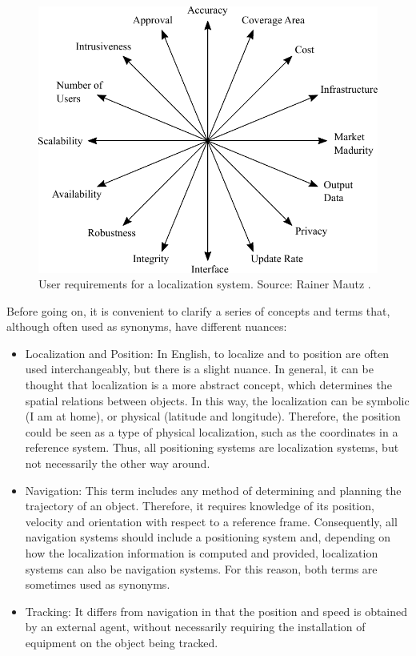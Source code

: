 \begin{figure}[!t]
    \centering
	\includegraphics[width=\textwidth]{Mautz_reqs_vectorial_text}    	
	\caption[User requirements for a localization system]{User requirements for a localization system. Source: Rainer Mautz \cite{mautz_rainer_indoor_2012}.}
	\label{fig:IPS_req_mautz}
\end{figure}

Before going on, it is convenient to clarify a series of concepts and terms that, although often used as synonyms, have different nuances:
\begin{itemize}
	\item Localization and Position: In English, to localize and to position are often used interchangeably, but there is a slight nuance. In general, it can be thought that localization is a more abstract concept, which determines the spatial relations between objects. In this way, the localization can be symbolic (I am at home), or physical (latitude and longitude). Therefore, the position could be seen as a type of physical localization, such as the coordinates in a reference system. Thus, all positioning systems are localization systems, but not necessarily the other way around.	
	\item Navigation: This term includes any method of determining and planning the trajectory of an object. Therefore, it requires knowledge of its position, velocity and orientation with respect to a reference frame. Consequently, all navigation systems should include a positioning system and, depending on how the localization information is computed and provided, localization systems can also be navigation systems. For this reason, both terms are sometimes used as synonyms.
	\item Tracking: It differs from navigation in that the position and speed is obtained by an external agent, without necessarily requiring the installation of equipment on the object being tracked.	
\end{itemize}

